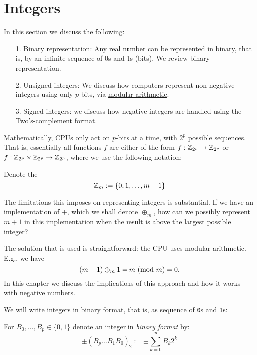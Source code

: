 
\section{Integers}
In this section we discuss the following:

\begin{itemize}
\item[1. ] Binary representation: Any real number can be represented in binary, that is, by an infinite sequence of 0s and 1s (bits). We review  binary representation.


\item[2. ] Unsigned integers:  We discuss how computers represent non-negative integers using only $p$-bits, via \href{https://en.wikipedia.org/wiki/Modular_arithmetic}{modular arithmetic}.


\item[3. ] Signed integers: we discuss how negative integers are handled using the \href{https://en.wikipedia.org/wiki/Two's_complement}{Two's-complement} format.

\end{itemize}
Mathematically, CPUs only act on $p$-bits at a time, with $2^p$ possible sequences. That is, essentially all functions $f$ are either of the form $f : {\mathbb Z}_{2^p} \rightarrow {\mathbb Z}_{2^p}$ or  $f : {\mathbb Z}_{2^p} \times {\mathbb Z}_{2^p} \rightarrow {\mathbb Z}_{2^p}$, where we use the following notation:

\begin{definition} Denote the
\[
{\mathbb Z}_m := \{0 , 1 , \ldots, m-1 \}
\]
\end{definition}

The limitations this imposes on representing integers is substantial.  If we have an implementation of $+$, which we shall denote $\ensuremath{\oplus}_m$, how can we possibly represent $m + 1$ in this implementation when the result is above the largest possible integer?

The solution that is used is straightforward: the CPU uses modular arithmetic. E.g., we have
\[
(m-1) \ensuremath{\oplus}_m 1 = m\ ({\rm mod}\ m) = 0.
\]
In this chapter we discuss the implications of this approach and how it works with negative numbers.

We will write integers in binary format, that is, as sequence of \texttt{0}s and \texttt{1}s:

\begin{definition} For $B_0,\ldots,B_p \in \{0,1\}$ denote an integer in \emph{binary format} by:
\[
\ensuremath{\pm}(B_p\ldots B_1B_0)_2 := \ensuremath{\pm}\sum_{k=0}^p B_k 2^k
\]
\end{definition}

